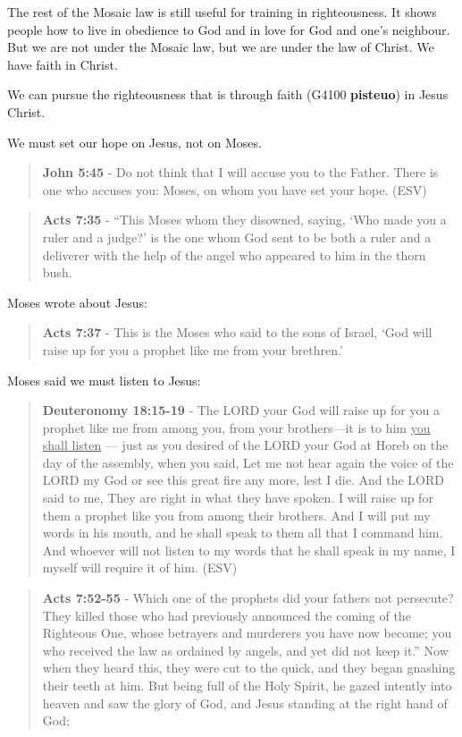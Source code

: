 \documentclass[11pt]{article}
\begin{document}
The rest of the Mosaic law is still useful for training in righteousness. It shows people how to live in obedience to God and in love for God and one's neighbour. But we are not under the Mosaic law, but we are under the law of Christ. We have faith in Christ.

We can pursue the righteousness that is through faith (G4100 \textbf{pisteuo}) in Jesus Christ.

We must set our hope on Jesus, not on Moses.

\begin{quote}
\textbf{John 5:45} -  Do not think that I will accuse you to the Father.  There is one who accuses you: Moses, on whom you have set your hope.  (ESV)
\end{quote}

\begin{quote}
\textbf{Acts 7:35} - “This Moses whom they disowned, saying, ‘Who made you a ruler and a judge?’ is the one whom God sent to be both a ruler and a deliverer with the help of the angel who appeared to him in the thorn bush.
\end{quote}

Moses wrote about Jesus:

\begin{quote}
\textbf{Acts 7:37} - This is the Moses who said to the sons of Israel, ‘God will raise up for you a prophet like me from your brethren.’
\end{quote}

Moses said we must listen to Jesus:

\begin{quote}
\textbf{Deuteronomy 18:15-19} - The LORD your God will raise up for you a prophet like me from among you, from your brothers—it is to him \uline{you shall listen} — just as you desired of the LORD your God at Horeb on the day of the assembly, when you said, Let me not hear again the voice of the LORD my God or see this great fire any more, lest I die. And the LORD said to me, They are right in what they have spoken. I will raise up for them a prophet like you from among their brothers. And I will put my words in his mouth, and he shall speak to them all that I command him. And whoever will not listen to my words that he shall speak in my name, I myself will require it of him. (ESV)
\end{quote}

\begin{quote}
\textbf{Acts 7:52-55} - Which one of the prophets did your fathers not persecute? They killed those who had previously announced the coming of the Righteous One, whose betrayers and murderers you have now become; you who received the law as ordained by angels, and yet did not keep it.” Now when they heard this, they were cut to the quick, and they began gnashing their teeth at him.  But being full of the Holy Spirit, he gazed intently into heaven and saw the glory of God, and Jesus standing at the right hand of God;
\end{quote}
\end{document}
